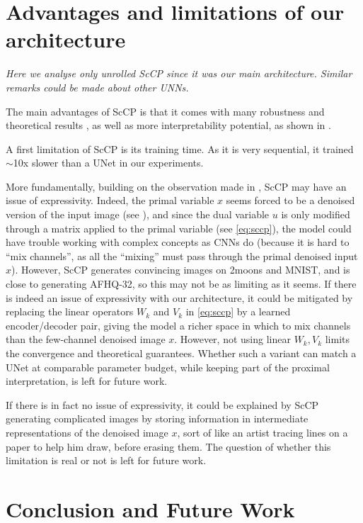 \documentclass[a4paper,11pt]{article}
\theoremstyle{plain}{\theorembodyfont{\rmfamily}%
\newtheorem{proposition}[theorem]{Proposition}}
\theoremstyle{plain}{\theorembodyfont{\rmfamily}%
\newtheorem{notation}[theorem]{Notation}}
\theoremstyle{plain}{\theorembodyfont{\rmfamily}%
\newtheorem{assumption}[theorem]{Assumption}}
\theoremstyle{plain}{\theorembodyfont{\rmfamily}%
\newtheorem{problem}[theorem]{Problem}}
\theoremstyle{plain}{\theorembodyfont{\rmfamily}%
\newtheorem{example}[theorem]{Example}}
\theoremstyle{plain}{\theorembodyfont{\rmfamily}%
\newtheorem{remark}[theorem]{Remark}}
\theoremstyle{plain}{\theorembodyfont{\rmfamily}%
\newtheorem{definition}[theorem]{Definition}}
\theoremstyle{plain}{\theorembodyfont{\rmfamily}%
\newtheorem{question}[theorem]{Question}}
\numberwithin{equation}{section}
\begin{document}
\section{Advantages and limitations of our architecture}
\label{sec:advantages_limits}
    
\emph{Here we analyse only unrolled ScCP since it was our main architecture. Similar remarks could be made about other UNNs.}

The main advantages of ScCP is that it comes with many robustness and theoretical results \cite{le2024unfolded}, as well as more interpretability potential, as shown in .

A first limitation of ScCP is its training time. As it is very sequential, it trained $\sim$10x slower than a UNet in our experiments.

More fundamentally, building on the observation made in , ScCP may have an issue of expressivity.
Indeed, the primal variable $x$ seems forced to be a denoised version of the input image (see ), and since the dual variable $u$ is only modified through a matrix applied to the primal variable (see \eqref{eq:sccp}), the model could have trouble working with complex concepts as CNNs do (because it is hard to ``mix channels'', as all the ``mixing'' must pass through the primal denoised input $x$). However, ScCP generates convincing images on 2moons and MNIST, and is close to generating AFHQ-32, so this may not be as limiting as it seems. If there is indeed an issue of expressivity with our architecture, it could be mitigated by replacing the linear operators $W_k$ and $V_k$ in \eqref{eq:sccp} by a learned encoder/decoder pair, giving the model a richer space in which to mix channels than the few-channel denoised image $x$. However, not using linear $W_k, V_k$ limits the convergence and theoretical guarantees. Whether such a variant can match a UNet at comparable parameter budget, while keeping part of the proximal interpretation, is left for future work.

If there is in fact no issue of expressivity, it could be explained by ScCP generating complicated images by storing information in intermediate representations of the denoised image $x$, sort of like an artist tracing lines on a paper to help him draw, before erasing them. The question of whether this limitation is real or not is left for future work.

\section{Conclusion and Future Work}
\label{sec:conclusion}
\end{document}
